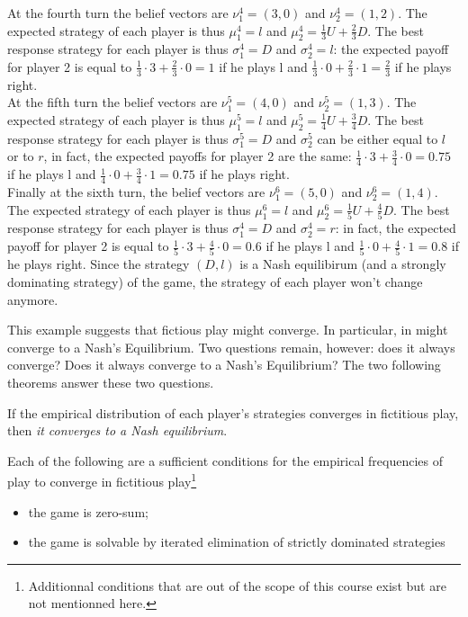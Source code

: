 \begin{example}
At the fourth turn the belief vectors are $\nu_1^4=(3,0)$ and $\nu_2^4=(1,2)$.
The expected strategy of each player is thus $\mu_1^4=l$ and
$\mu_2^4=\frac{1}{3}U+\frac{2}{3}D$. The best response strategy for each
player is thus $\sigma_1^4=D$ and $\sigma_2^4=l$: the expected payoff for
player 2 is equal to $\frac{1}{3}\cdot3+\frac{2}{3}\cdot0=1$ if he plays l and
$\frac{1}{3}\cdot0+\frac{2}{3}\cdot1=\frac{2}{3}$ if he plays right.\\

At the fifth turn the belief vectors are $\nu_1^5=(4,0)$ and $\nu_2^5=(1,3)$.
The expected strategy of each player is thus $\mu_1^5=l$ and
$\mu_2^5=\frac{1}{4}U+\frac{3}{4}D$. The best response strategy for each
player is thus $\sigma_1^5=D$ and $\sigma_2^5$ can be either equal to $l$
or to $r$, in fact, the expected payoffs for player 2 are the same:
$\frac{1}{4}\cdot3+\frac{3}{4}\cdot0=0.75$ if he plays l and
$\frac{1}{4}\cdot0+\frac{3}{4}\cdot1=0.75$ if he plays right.\\

Finally at the sixth turn, the belief vectors are $\nu_1^6=(5,0)$ and
$\nu_2^6=(1,4)$. The expected strategy of each player is thus $\mu_1^6=l$
and $\mu_2^6=\frac{1}{5}U+\frac{4}{5}D$. The best response strategy for
each player is thus $\sigma_1^4=D$ and $\sigma_2^4=r$: in fact,  the
expected payoff for player 2 is equal to $\frac{1}{5}\cdot3+\frac{4}{5}\cdot0=0.6$
if he plays l and $\frac{1}{5}\cdot0+\frac{4}{5}\cdot1=0.8$ if he plays right.
Since the strategy $(D,l)$ is a Nash equilibirum (and a strongly dominating
strategy) of the game, the strategy of each player won't change anymore.\\
\end{example}

This example suggests that fictious play might converge. In particular,
in might converge to a Nash's Equilibrium. Two questions remain, however:
does it always converge? Does it always converge to a Nash's Equilibrium?
The two following theorems answer these two questions.

\begin{theorem}
    \label{thm:fpconvergence}
    If the empirical distribution of each player's strategies converges in
    fictitious play, then \emph{it converges to a Nash equilibrium}.
\end{theorem}

\begin{theorem}
    \label{thm:fpconvergencecond}
    Each of the following are a sufficient conditions for the empirical
    frequencies of play to converge in fictitious play\footnote{Additionnal
    conditions that are out of the scope of this course exist but are not
    mentionned here.}
    \begin{itemize}
        \item the game is zero-sum;
        \item the game is solvable by iterated elimination of strictly dominated strategies
    \end{itemize}
\end{theorem}

